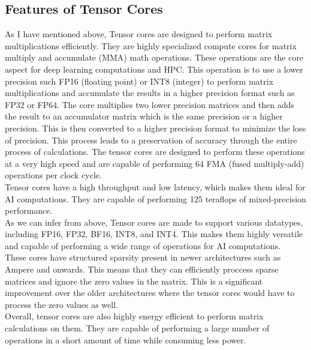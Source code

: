 \documentclass[12pt]{article}
\begin{document}
\subsection{Features of Tensor Cores}
As I have mentioned above, Tensor cores are designed to perform matrix multiplications efficiently. They are highly specialized compute cores for matrix multiply and accumulate (MMA) math operations. These operations are the core aspect for deep learning computations and HPC.
This operation is to use a lower precision such FP16 (floating point) or INT8 (integer) to perform matrix multiplications and accumulate the results in a higher precision format such as FP32 or FP64. The core multiplies two lower precision matrices and then adds the result to an accumulator matrix which is the same precision or a higher precision. This is then converted to a higher precision format to minimize the loss of precision. This process leads to a preservation of accuracy through the entire process of calculations.
The tensor cores are designed to perform these operations at a very high speed and are capable of performing 64 FMA (fused multiply-add) operations per clock cycle.\\
Tensor cores have a high throughput and low latency, which makes them ideal for AI computations. They are capable of performing 125 teraflops of mixed-precision performance.\\
As we can infer from above, Tensor cores are made to support various datatypes, including FP16, FP32, BF16, INT8, and INT4. This makes them highly versatile and capable of performing a wide range of operations for AI computations.\\
These cores have structured sparsity present in newer architectures such as Ampere and onwards. This means that they can efficiently proccess sparse matrices and ignore the zero values in the matrix. This is a significant improvement over the older architectures where the tensor cores would have to process the zero values as well.\\
Overall, tensor cores are also highly energy efficient to perform matrix calculations on them. They are capable of performing a large number of operations in a short amount of time while consuming less power.
\end{document}

